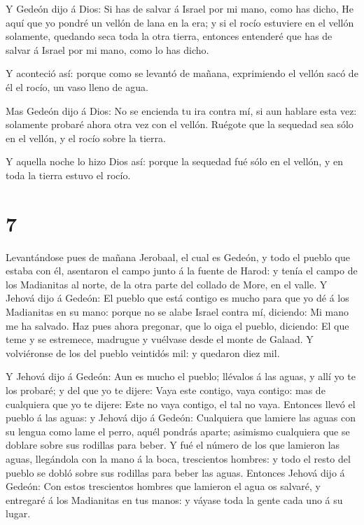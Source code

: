  Y Gedeón dijo á Dios: Si has de salvar á Israel por mi
mano, como has dicho,  He aquí que yo pondré un vellón de
lana en la era; y si el rocío estuviere en el vellón solamente, quedando
seca toda la otra tierra, entonces entenderé que has de salvar á Israel
por mi mano, como lo has dicho.

 Y aconteció así: porque como se levantó de mañana,
exprimiendo el vellón sacó de él el rocío, un vaso lleno de agua.

 Mas Gedeón dijo á Dios: No se encienda tu ira contra mí,
si aun hablare esta vez: solamente probaré ahora otra vez con el vellón.
Ruégote que la sequedad sea sólo en el vellón, y el rocío sobre la
tierra.

 Y aquella noche lo hizo Dios así: porque la sequedad fué
sólo en el vellón, y en toda la tierra estuvo el rocío.

\hypertarget{section-6}{%
\section{7}\label{section-6}}

 Levantándose pues de mañana Jerobaal, el cual es Gedeón, y
todo el pueblo que estaba con él, asentaron el campo junto á la fuente
de Harod: y tenía el campo de los Madianitas al norte, de la otra parte
del collado de More, en el valle.  Y Jehová dijo á Gedeón:
El pueblo que está contigo es mucho para que yo dé á los Madianitas en
su mano: porque no se alabe Israel contra mí, diciendo: Mi mano me ha
salvado.  Haz pues ahora pregonar, que lo oiga el pueblo,
diciendo: El que teme y se estremece, madrugue y vuélvase desde el monte
de Galaad. Y volviéronse de los del pueblo veintidós mil: y quedaron
diez mil.

 Y Jehová dijo á Gedeón: Aun es mucho el pueblo; llévalos á
las aguas, y allí yo te los probaré; y del que yo te dijere: Vaya este
contigo, vaya contigo: mas de cualquiera que yo te dijere: Este no vaya
contigo, el tal no vaya.  Entonces llevó el pueblo á las
aguas: y Jehová dijo á Gedeón: Cualquiera que lamiere las aguas con su
lengua como lame el perro, aquél pondrás aparte; asimismo cualquiera que
se doblare sobre sus rodillas para beber.  Y fué el número
de los que lamieron las aguas, llegándola con la mano á la boca,
trescientos hombres: y todo el resto del pueblo se dobló sobre sus
rodillas para beber las aguas.  Entonces Jehová dijo á
Gedeón: Con estos trescientos hombres que lamieron el agua os salvaré, y
entregaré á los Madianitas en tus manos: y váyase toda la gente cada uno
á su lugar.

